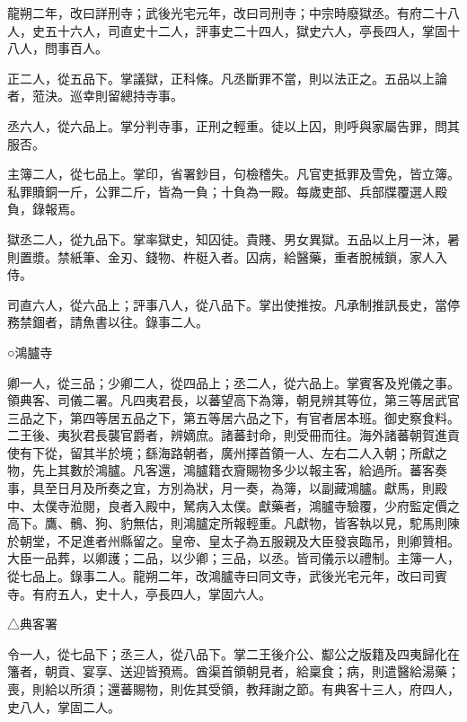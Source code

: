 \begin{pinyinscope}
 龍朔二年，改曰詳刑寺；武後光宅元年，改曰司刑寺；中宗時廢獄丞。有府二十八人，史五十六人，司直史十二人，評事史二十四人，獄史六人，亭長四人，掌固十八人，問事百人。



 正二人，從五品下。掌議獄，正科條。凡丞斷罪不當，則以法正之。五品以上論者，蒞決。巡幸則留總持寺事。



 丞六人，從六品上。掌分判寺事，正刑之輕重。徒以上囚，則呼與家屬告罪，問其服否。



 主簿二人，從七品上。掌印，省署鈔目，句檢稽失。凡官吏抵罪及雪免，皆立簿。私罪贖銅一斤，公罪二斤，皆為一負；十負為一殿。每歲吏部、兵部牒覆選人殿負，錄報焉。



 獄丞二人，從九品下。掌率獄史，知囚徒。貴賤、男女異獄。五品以上月一沐，暑則置漿。禁紙筆、金刃、錢物、杵梃入者。囚病，給醫藥，重者脫械鎖，家人入侍。



 司直六人，從六品上；評事八人，從八品下。掌出使推按。凡承制推訊長史，當停務禁錮者，請魚書以往。錄事二人。



 ○鴻臚寺



 卿一人，從三品；少卿二人，從四品上；丞二人，從六品上。掌賓客及兇儀之事。領典客、司儀二署。凡四夷君長，以蕃望高下為簿，朝見辨其等位，第三等居武官三品之下，第四等居五品之下，第五等居六品之下，有官者居本班。御史察食料。二王後、夷狄君長襲官爵者，辨嫡庶。諸蕃封命，則受冊而往。海外諸蕃朝賀進貢使有下從，留其半於境；繇海路朝者，廣州擇首領一人、左右二人入朝；所獻之物，先上其數於鴻臚。凡客還，鴻臚籍衣齎賜物多少以報主客，給過所。蕃客奏事，具至日月及所奏之宜，方別為狀，月一奏，為簿，以副藏鴻臚。獻馬，則殿中、太僕寺涖閱，良者入殿中，駑病入太僕。獻藥者，鴻臚寺驗覆，少府監定價之高下。鷹、鶻、狗、豹無估，則鴻臚定所報輕重。凡獻物，皆客執以見，駝馬則陳於朝堂，不足進者州縣留之。皇帝、皇太子為五服親及大臣發哀臨吊，則卿贊相。大臣一品葬，以卿護；二品，以少卿；三品，以丞。皆司儀示以禮制。主簿一人，從七品上。錄事二人。龍朔二年，改鴻臚寺曰同文寺，武後光宅元年，改曰司賓寺。有府五人，史十人，亭長四人，掌固六人。



 △典客署



 令一人，從七品下；丞三人，從八品下。掌二王後介公、酅公之版籍及四夷歸化在籓者，朝貢、宴享、送迎皆預焉。酋渠首領朝見者，給稟食；病，則遣醫給湯藥；喪，則給以所須；還蕃賜物，則佐其受領，教拜謝之節。有典客十三人，府四人，史八人，掌固二人。




\end{pinyinscope}

